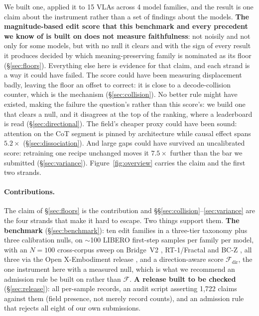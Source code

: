\documentclass[11pt]{article}
\begin{document}
We built one, applied it to 15 VLAs across 4 model families, and the result is one claim about the instrument rather than a set of findings about the models. \textbf{The magnitude-based edit score that this benchmark and every precedent we know of is built on does not measure faithfulness}: not noisily and not only for some models, but with no null it clears and with the sign of every result it produces decided by which meaning-preserving family is nominated as its floor (\S\ref{sec:floors}). Everything else here is evidence for that claim, and each strand is a way it could have failed. The score could have been measuring displacement badly, leaving the floor an offset to correct: it is close to a decode-collision counter, which is the mechanism (\S\ref{sec:collision}). No better rule might have existed, making the failure the question's rather than this score's: we build one that clears a null, and it disagrees at the top of the ranking, where a leaderboard is read (\S\ref{sec:directional}). The field's cheaper proxy could have been sound: attention on the CoT segment is pinned by architecture while causal effect spans $5.2\times$ (\S\ref{sec:dissociation}). And large gaps could have survived an uncalibrated score: retraining one recipe unchanged moves it $7.5\times$ further than the bar we submitted (\S\ref{sec:variance}). Figure~\ref{fig:overview} carries the claim and the first two strands.

\paragraph{Contributions.} The claim of \S\ref{sec:floors} is the contribution and \S\S\ref{sec:collision}--\ref{sec:variance} are the four strands that make it hard to escape. Two things support them. \textbf{The benchmark} (\S\ref{sec:benchmark}): ten edit families in a three-tier taxonomy plus three calibration nulls, on $\sim$100 LIBERO first-step samples per family per model, with an $N{=}100$ cross-corpus sweep on Bridge~V2 \citep{bridgev2}, RT-1/Fractal \citep{rt1} and BC-Z \citep{bcz}, all three via the Open X-Embodiment release \citep{openx}, and a direction-aware score $\mathcal{F}_{\text{dir}}$, the one instrument here with a measured null, which is what we recommend an admission rule be built on rather than $\mathcal{F}$. \textbf{A release built to be checked} (\S\ref{sec:release}): all per-sample records, an audit script asserting 1,722 claims against them (field presence, not merely record counts), and an admission rule that rejects all eight of our own submissions.
\end{document}
